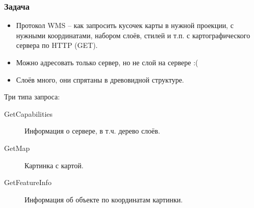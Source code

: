 \begin{frame}
  \frametitle{Задача}

  \begin{itemize}
  \item Протокол WMS -- как запросить кусочек карты в нужной проекции,
    с нужными координатами, набором слоёв, стилей и т.п. с
    картографического сервера по HTTP (GET).
  \item Можно адресовать только сервер, но не слой на сервере :(
  \item Слоёв много, они спрятаны в древовидной структуре.
  \end{itemize}

  Три типа запроса:
  \begin{description}
  \item[GetCapabilities] Информация о сервере, в т.ч. дерево слоёв.
  \item[GetMap] Картинка с картой.
  \item[GetFeatureInfo] Информация об объекте по координатам картинки.
  \end{description}
\end{frame}
